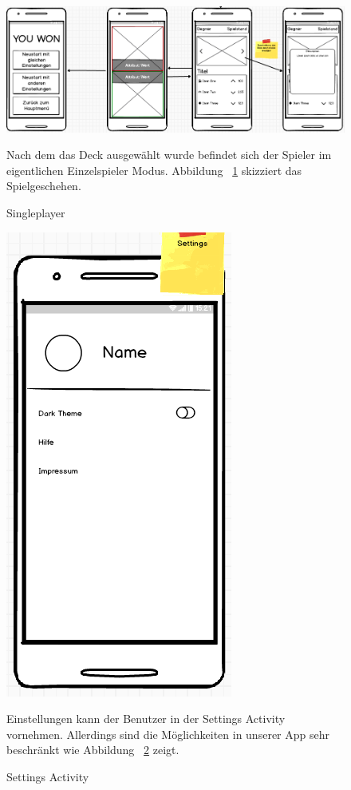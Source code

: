 \documentclass{scrartcl}
\begin{document}
\begin{figure}[!ht]
\begin{center}
	\includegraphics[scale=0.55]{img/mockup_game_process_2.png}
	\caption{Singleplayer}
	\label{singleplayer2}
\end{center}
Nach dem das Deck ausgewählt wurde befindet sich der Spieler im eigentlichen
Einzelspieler Modus. Abbildung ~\ref{singleplayer2} skizziert das
Spielgeschehen.
\end{figure}

\begin{figure}[!ht]
\begin{center}
	\centering
	\includegraphics[scale=0.6]{img/mockup_settings.png}
	\caption{Settings Activity}
	\label{settings}
\end{center}
Einstellungen kann der Benutzer in der Settings Activity vornehmen. Allerdings
sind die Möglichkeiten in unserer App sehr beschränkt wie Abbildung
~\ref{settings} zeigt.
\end{figure}
\end{document}
